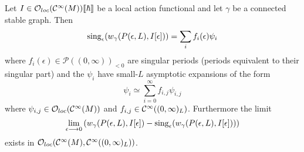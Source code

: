 \begin{theo}
  Let $I \in \mathcal{O}_{loc}(\mathcal{C}^{\infty}(M)) \llbracket \hbar \rrbracket$ be a local action functional and let $\gamma$ be a connected stable graph. Then
  \begin{equation}
    \sing_\epsilon(w_\gamma(P(\epsilon,L), I[\epsilon])) = \sum_i f_i(\epsilon) \psi_i
  \end{equation}
  where $f_i(\epsilon) \in \mathcal{P}((0,\infty))_{<0}$ are singular periods (periods equivalent to their singular part) and the $\psi_i$ have small-$L$ asymptotic expansions of the form
  \begin{equation}
    \psi_i \simeq \sum_{i = 0}^\infty f_{i,j} \psi_{i,j}
  \end{equation}
  where $\psi_{i,j} \in \mathcal{O}_{loc}(\mathcal{C}^{\infty}(M))$ and $f_{i,j} \in \mathcal{C}^{\infty}((0,\infty)_L)$. Furthermore the limit
  \begin{equation}
    \lim_{\epsilon \lra 0} \left( w_\gamma (P(\epsilon,L), I[\epsilon]) - \sing_\epsilon(w_\gamma (P(\epsilon,L), I[\epsilon])) \right)
  \end{equation}
  exists in $\mathcal{O}_{loc}(\mathcal{C}^{\infty}(M), \mathcal{C}^{\infty}((0,\infty)_L))$.
\end{theo}

